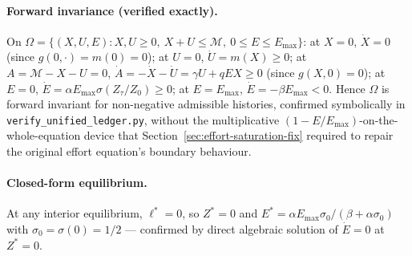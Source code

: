 \documentclass[twocolumn,10pt]{article}
\begin{document}
\paragraph{Forward invariance (verified exactly).} On $\Omega=\{(X,U,E): X,U\ge0,\ X+U\le\mathcal M,\ 0\le E\le E_{\max}\}$: at $X=0$, $\dot X=0$ (since $g(0,\cdot)=m(0)=0$); at $U=0$, $\dot U=m(X)\ge0$; at $A=\mathcal M-X-U=0$, $\dot A=-\dot X-\dot U=\gamma U+qEX\ge0$ (since $g(X,0)=0$); at $E=0$, $\dot E=\alpha E_{\max}\sigma(Z_\tau/Z_0)\ge0$; at $E=E_{\max}$, $\dot E=-\beta E_{\max}<0$. Hence $\Omega$ is forward invariant for non-negative admissible histories, confirmed symbolically in \texttt{verify\_unified\_ledger.py}, without the multiplicative $(1-E/E_{\max})$-on-the-whole-equation device that Section~\ref{sec:effort-saturation-fix} required to repair the original effort equation's boundary behaviour.

\paragraph{Closed-form equilibrium.} At any interior equilibrium, $\ell^*=0$, so $Z^*=0$ and $E^*=\alpha E_{\max}\sigma_0/(\beta+\alpha\sigma_0)$ with $\sigma_0=\sigma(0)=1/2$ --- confirmed by direct algebraic solution of $\dot E=0$ at $Z^*=0$.
\end{document}
